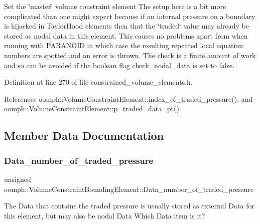 Set the \char`\"{}master\char`\"{} volume constraint element The setup here is a bit more complicated than one might expect because if an internal pressure on a boundary is hijacked in Taylor\+Hood elements then that the \char`\"{}traded\char`\"{} value may already be stored as nodal data in this element. This causes no problems apart from when running with P\+A\+R\+A\+N\+O\+ID in which case the resulting repeated local equation numbers are spotted and an error is thrown. The check is a finite amount of work and so can be avoided if the boolean flag check\+\_\+nodal\+\_\+data is set to false. 



Definition at line 270 of file constrained\+\_\+volume\+\_\+elements.\+h.



References oomph\+::\+Volume\+Constraint\+Element\+::index\+\_\+of\+\_\+traded\+\_\+pressure(), and oomph\+::\+Volume\+Constraint\+Element\+::p\+\_\+traded\+\_\+data\+\_\+pt().



\subsection{Member Data Documentation}
\mbox{\label{classoomph_1_1VolumeConstraintBoundingElement_afd35462188f27b6851416ab49ec5df5a}} 
\subsubsection{\texorpdfstring{Data\+\_\+number\+\_\+of\+\_\+traded\+\_\+pressure}{Data\_number\_of\_traded\_pressure}}
{\footnotesize\ttfamily unsigned oomph\+::\+Volume\+Constraint\+Bounding\+Element\+::\+Data\+\_\+number\+\_\+of\+\_\+traded\+\_\+pressure\hspace{0.3cm}{\ttfamily [protected]}}



The Data that contains the traded pressure is usually stored as external Data for this element, but may also be nodal Data Which Data item is it? 



